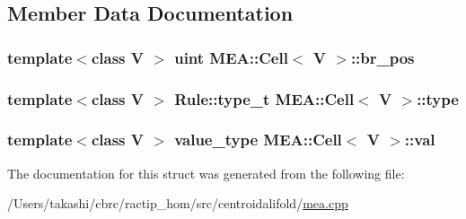 \subsection{Member Data Documentation}
\hypertarget{struct_m_e_a_1_1_cell_a28c611efa289efb253ea635f394576f1}{
\subsubsection[{br\+\_\+pos}]{\setlength{\rightskip}{0pt plus 5cm}template$<$class V $>$ {\bf uint} {\bf M\+E\+A\+::\+Cell}$<$ V $>$\+::br\+\_\+pos}}\label{struct_m_e_a_1_1_cell_a28c611efa289efb253ea635f394576f1}
\hypertarget{struct_m_e_a_1_1_cell_a3f39a9889767a12ffd09c9d4ec0722b5}{
\subsubsection[{type}]{\setlength{\rightskip}{0pt plus 5cm}template$<$class V $>$ {\bf Rule\+::type\+\_\+t} {\bf M\+E\+A\+::\+Cell}$<$ V $>$\+::type}}\label{struct_m_e_a_1_1_cell_a3f39a9889767a12ffd09c9d4ec0722b5}
\hypertarget{struct_m_e_a_1_1_cell_a2561f0900802700778a51698ba33ee57}{
\subsubsection[{val}]{\setlength{\rightskip}{0pt plus 5cm}template$<$class V $>$ {\bf value\+\_\+type} {\bf M\+E\+A\+::\+Cell}$<$ V $>$\+::val}}\label{struct_m_e_a_1_1_cell_a2561f0900802700778a51698ba33ee57}


The documentation for this struct was generated from the following file\+:\begin{DoxyCompactItemize}
\item 
/\+Users/takashi/cbrc/ractip\+\_\+hom/src/centroidalifold/\hyperlink{mea_8cpp}{mea.\+cpp}\end{DoxyCompactItemize}
